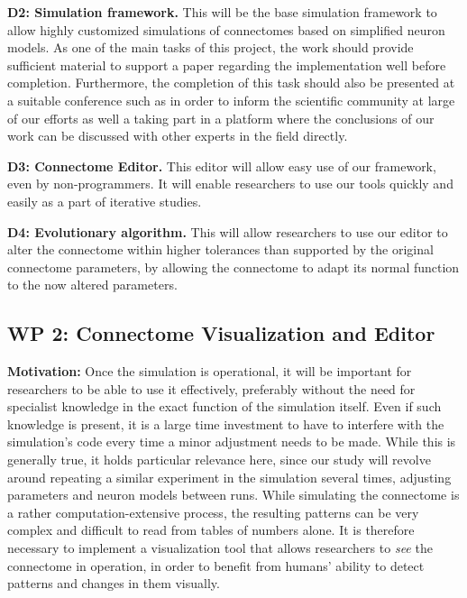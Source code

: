 \documentclass[a4paper,11pt]{article}
\begin{document}
\textbf{D2: Simulation framework.} This will be the base simulation framework to allow highly customized simulations of connectomes based on simplified neuron models. As one of the main tasks of this project, the work should provide sufficient material to support a paper regarding the implementation well before completion. Furthermore, the completion of this task should also be presented at a suitable conference such as  in order to inform the scientific community at large of our efforts as well a taking part in a platform where the conclusions of our work can be discussed with other experts in the field directly.

\textbf{D3: Connectome Editor.} This editor will allow easy use of our framework, even by non-programmers. It will enable researchers to use our tools quickly and easily as a part of iterative studies. 

\textbf{D4: Evolutionary algorithm.} This will allow researchers to use our editor to alter the connectome within higher tolerances than supported by the original connectome parameters, by allowing the connectome to adapt its normal function to the now altered parameters. 


\subsection{WP 2: Connectome Visualization and Editor}

\textbf{Motivation:}
Once the simulation is operational, it will be important for researchers to be able to use it effectively, preferably without the need for specialist knowledge in the exact function of the simulation itself. Even if such knowledge is present, it is a large time investment to have to interfere with the simulation's code every time a minor adjustment needs to be made. While this is generally true, it holds particular relevance here, since our study will revolve around repeating a similar experiment in the simulation several times, adjusting parameters and neuron models between runs.
While simulating the connectome is a rather computation-extensive process, the resulting patterns can be very complex and difficult to read from tables of numbers alone. It is therefore necessary to implement a visualization tool that allows researchers to \emph{see} the connectome in operation, in order to benefit from humans' ability to detect patterns and changes in them visually.
\end{document}

